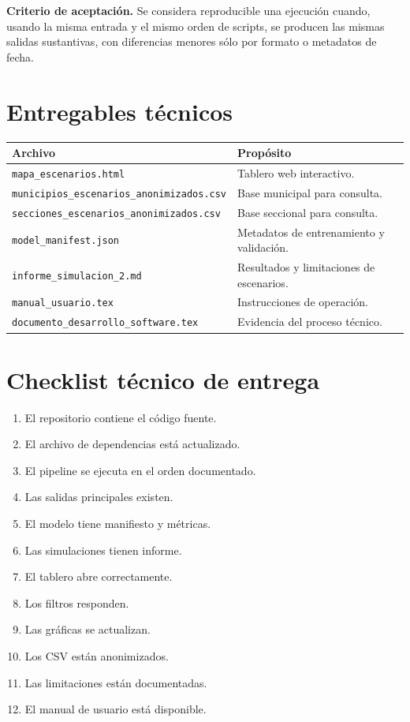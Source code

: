 \documentclass[11pt,a4paper]{article}
\newcommand{\ruta}[1]{\texttt{\small #1}}
\begin{document}
\begin{quality}
\textbf{Criterio de aceptación.} Se considera reproducible una ejecución cuando, usando la misma entrada y el mismo orden de scripts, se producen las mismas salidas sustantivas, con diferencias menores sólo por formato o metadatos de fecha.
\end{quality}

\section{Entregables técnicos}

\begin{longtable}{p{}p{}}
\toprule
\textbf{Archivo} & \textbf{Propósito}\\
\midrule
\ruta{mapa\_escenarios.html} & Tablero web interactivo.\\
\ruta{municipios\_escenarios\_anonimizados.csv} & Base municipal para consulta.\\
\ruta{secciones\_escenarios\_anonimizados.csv} & Base seccional para consulta.\\
\ruta{model\_manifest.json} & Metadatos de entrenamiento y validación.\\
\ruta{informe\_simulacion\_2.md} & Resultados y limitaciones de escenarios.\\
\ruta{manual\_usuario.tex} & Instrucciones de operación.\\
\ruta{documento\_desarrollo\_software.tex} & Evidencia del proceso técnico.\\
\bottomrule
\end{longtable}

\section{Checklist técnico de entrega}

\begin{enumerate}
    \item El repositorio contiene el código fuente.
    \item El archivo de dependencias está actualizado.
    \item El pipeline se ejecuta en el orden documentado.
    \item Las salidas principales existen.
    \item El modelo tiene manifiesto y métricas.
    \item Las simulaciones tienen informe.
    \item El tablero abre correctamente.
    \item Los filtros responden.
    \item Las gráficas se actualizan.
    \item Los CSV están anonimizados.
    \item Las limitaciones están documentadas.
    \item El manual de usuario está disponible.
\end{enumerate}
\end{document}

